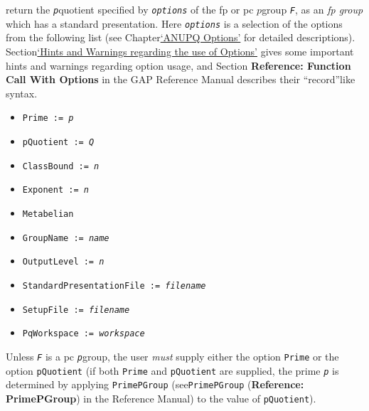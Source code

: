 \documentclass[a4paper,11pt]{report}
\begin{document}
{{{ return the \mbox{\texttt{\mdseries\slshape p}}\texttt{}quotient specified by \mbox{\texttt{\mdseries\slshape options}} of the fp or pc $p$\texttt{}group \mbox{\texttt{\mdseries\slshape F}}, as an \emph{fp group} which has a standard presentation. Here \mbox{\texttt{\mdseries\slshape options}} is a selection of the options from the following list (see
Chapter{\nobreakspace}\hyperref[ANUPQ Options]{`ANUPQ Options'} for detailed descriptions). Section{\nobreakspace}\hyperref[Hints and Warnings regarding the use of Options]{`Hints and Warnings regarding the use of Options'} gives some important hints and warnings regarding option usage, and
Section{\nobreakspace} \textbf{Reference: Function Call With Options} in the \textsf{GAP} Reference Manual describes their ``record''\texttt{}like syntax. 
\begin{itemize}
\item  \texttt{Prime := \mbox{\texttt{\mdseries\slshape p}}} 
\item  \texttt{pQuotient := \mbox{\texttt{\mdseries\slshape Q}}} 
\item  \texttt{ClassBound := \mbox{\texttt{\mdseries\slshape n}}} 
\item  \texttt{Exponent := \mbox{\texttt{\mdseries\slshape n}}} 
\item  \texttt{Metabelian} 
\item  \texttt{GroupName := \mbox{\texttt{\mdseries\slshape name}}} 
\item  \texttt{OutputLevel := \mbox{\texttt{\mdseries\slshape n}}} 
\item  \texttt{StandardPresentationFile := \mbox{\texttt{\mdseries\slshape filename}}} 
\item  \texttt{SetupFile := \mbox{\texttt{\mdseries\slshape filename}}} 
\item  \texttt{PqWorkspace := \mbox{\texttt{\mdseries\slshape workspace}}} 
\end{itemize}
 Unless \mbox{\texttt{\mdseries\slshape F}} is a pc \mbox{\texttt{\mdseries\slshape p}}\texttt{}group, the user \emph{must} supply either the option \texttt{Prime} or the option \texttt{pQuotient} (if both \texttt{Prime} and \texttt{pQuotient} are supplied, the prime \mbox{\texttt{\mdseries\slshape p}} is determined by applying \texttt{PrimePGroup} (see{\nobreakspace}\texttt{PrimePGroup} (\textbf{Reference: PrimePGroup}) in the Reference Manual) to the value of \texttt{pQuotient}). 

}}}
\end{document}
